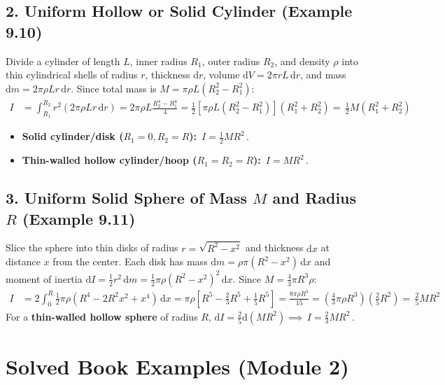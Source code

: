 \documentclass[11pt,a4paper,openany,oneside]{book}
\newcommand{\eqbox}[1]{\boxed{\,#1\,}}
\newcommand{\dd}{\,\mathrm{d}}
\newcommand{\diff}{\mathrm{d}}
\numberwithin{equation}{chapter}
\begin{document}
\subsection{2. Uniform Hollow or Solid Cylinder (Example 9.10)}
Divide a cylinder of length $L$, inner radius $R_1$, outer radius $R_2$, and density $\rho$ into thin cylindrical shells of radius $r$, thickness $\diff r$, volume $\diff V = 2\pi r L\dd r$, and mass $\diff m = 2\pi\rho L r\dd r$. Since total mass is $M = \pi\rho L(R_2^2 - R_1^2)$:
\begin{align}\label{eq:I_cyl}
  I &= \int_{R_1}^{R_2} r^2(2\pi\rho L r\dd r) = 2\pi\rho L\frac{R_2^4 - R_1^4}{4} = \frac{1}{2}\!\left[\pi\rho L(R_2^2 - R_1^2)\right](R_1^2 + R_2^2) = \eqbox{\frac{1}{2}M(R_1^2 + R_2^2)}
\end{align}
\begin{itemize}
  \item \textbf{Solid cylinder/disk ($R_1 = 0, R_2 = R$):} $\eqbox{I = \frac{1}{2}MR^2}$.
  \item \textbf{Thin-walled hollow cylinder/hoop ($R_1 = R_2 = R$):} $\eqbox{I = MR^2}$.
\end{itemize}

\subsection{3. Uniform Solid Sphere of Mass $M$ and Radius $R$ (Example 9.11)}
Slice the sphere into thin disks of radius $r = \sqrt{R^2 - x^2}$ and thickness $\diff x$ at distance $x$ from the center. Each disk has mass $\diff m = \rho\pi(R^2 - x^2)\dd x$ and moment of inertia $\diff I = \frac{1}{2}r^2\dd m = \frac{1}{2}\pi\rho(R^2 - x^2)^2\dd x$. Since $M = \frac{4}{3}\pi R^3\rho$:
\begin{align}\label{eq:I_sphere}
  I &= 2\int_0^R \frac{1}{2}\pi\rho(R^4 - 2R^2 x^2 + x^4)\dd x = \pi\rho\!\left[R^5 - \frac{2}{3}R^5 + \frac{1}{5}R^5\right] = \frac{8\pi\rho R^5}{15} = \left(\frac{4}{3}\pi\rho R^3\right)\!\left(\frac{2}{5}R^2\right) = \eqbox{\frac{2}{5}MR^2}
\end{align}
For a \textbf{thin-walled hollow sphere} of radius $R$, $\diff I = \frac{2}{5}\diff(MR^2) \implies \eqbox{I = \frac{2}{3}MR^2}$.

\section{Solved Book Examples (Module 2)}
\end{document}
